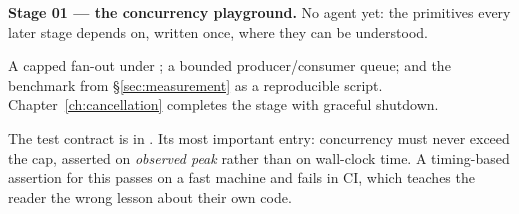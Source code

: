 \begin{projectbox}
\textbf{Stage 01 --- the concurrency playground.} No agent yet: the primitives
every later stage depends on, written once, where they can be understood.

A capped fan-out under ; a bounded producer/consumer queue; and
the benchmark from \S\ref{sec:measurement} as a reproducible script.
Chapter~\ref{ch:cancellation} completes the stage with graceful shutdown.

The test contract is in . Its most important
entry: concurrency must never exceed the cap, asserted on \emph{observed peak}
rather than on wall-clock time. A timing-based assertion for this passes on a
fast machine and fails in CI, which teaches the reader the wrong lesson about
their own code.
\end{projectbox}
